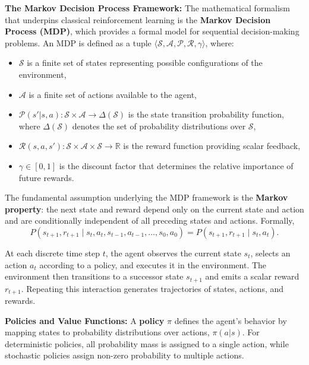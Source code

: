 \textbf{The Markov Decision Process Framework:}  
The mathematical formalism that underpins classical reinforcement learning is the \textbf{Markov Decision Process (MDP)}, which provides a formal model for sequential decision-making problems. An MDP is defined as a tuple $\langle \mathcal{S}, \mathcal{A}, \mathcal{P}, \mathcal{R}, \gamma \rangle$, where:
\begin{itemize}
    \item $\mathcal{S}$ is a finite set of states representing possible configurations of the environment,
    \item $\mathcal{A}$ is a finite set of actions available to the agent,
    \item $\mathcal{P}(s'|s,a) : \mathcal{S} \times \mathcal{A} \rightarrow \Delta(\mathcal{S})$ is the state transition probability function, where $\Delta(\mathcal{S})$ denotes the set of probability distributions over $\mathcal{S}$,
    \item $\mathcal{R}(s,a,s') : \mathcal{S} \times \mathcal{A} \times \mathcal{S} \rightarrow \mathbb{R}$ is the reward function providing scalar feedback,
    \item $\gamma \in [0,1]$ is the discount factor that determines the relative importance of future rewards.
\end{itemize}

The fundamental assumption underlying the MDP framework is the \textbf{Markov property}: the next state and reward depend only on the current state and action and are conditionally independent of all preceding states and actions. Formally,
\begin{equation}
P(s_{t+1}, r_{t+1} \mid s_t, a_t, s_{t-1}, a_{t-1}, \ldots, s_0, a_0)
=
P(s_{t+1}, r_{t+1} \mid s_t, a_t).
\label{eq:markov_property}
\end{equation}

At each discrete time step $t$, the agent observes the current state $s_t$, selects an action $a_t$ according to a policy, and executes it in the environment. The environment then transitions to a successor state $s_{t+1}$ and emits a scalar reward $r_{t+1}$. Repeating this interaction generates trajectories of states, actions, and rewards.

\textbf{Policies and Value Functions:}  
A \textbf{policy} $\pi$ defines the agent’s behavior by mapping states to probability distributions over actions, $\pi(a|s)$. For deterministic policies, all probability mass is assigned to a single action, while stochastic policies assign non-zero probability to multiple actions.

